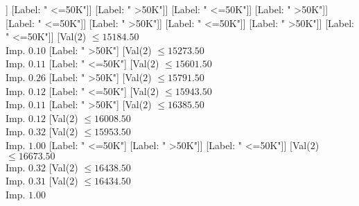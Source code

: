 \documentclass[margin=10pt]{standalone}
\begin{document}
\begin{forest}
																								[Val($2$) $ \leq 14215.50$ \\ Imp. $0.09$
																									[Val($2$) $ \leq 14183.50$ \\ Imp. $0.20$
																										[Val($2$) $ \leq 14078.50$ \\ Imp. $0.12$
																											[Val($2$) $ \leq 14009.50$ \\ Imp. $0.32$
																												[Val($2$) $ \leq 13907.50$ \\ Imp. $0.32$
																													[Val($2$) $ \leq 13831.50$ \\ Imp. $1.00$
																														[Label: " <=50K"]
																														[Label: " >50K"]]
																													[Label: " <=50K"]]
																												[Label: " >50K"]]
																											[Label: " <=50K"]]
																										[Label: " >50K"]]
																									[Label: " <=50K"]]
																								[Label: " >50K"]]
																							[Label: " <=50K"]]
																						[Label: " >50K"]]
																					[Label: " <=50K"]]
																				[Val($2$) $ \leq 15184.50$ \\ Imp. $0.10$
																					[Label: " >50K"]
																					[Val($2$) $ \leq 15273.50$ \\ Imp. $0.11$
																						[Label: " <=50K"]
																						[Val($2$) $ \leq 15601.50$ \\ Imp. $0.26$
																							[Label: " >50K"]
																							[Val($2$) $ \leq 15791.50$ \\ Imp. $0.12$
																								[Label: " <=50K"]
																								[Val($2$) $ \leq 15943.50$ \\ Imp. $0.11$
																									[Label: " >50K"]
																									[Val($2$) $ \leq 16385.50$ \\ Imp. $0.12$
																										[Val($2$) $ \leq 16008.50$ \\ Imp. $0.32$
																											[Val($2$) $ \leq 15953.50$ \\ Imp. $1.00$
																												[Label: " <=50K"]
																												[Label: " >50K"]]
																											[Label: " <=50K"]]
																										[Val($2$) $ \leq 16673.50$ \\ Imp. $0.32$
																											[Val($2$) $ \leq 16438.50$ \\ Imp. $0.31$
																												[Val($2$) $ \leq 16434.50$ \\ Imp. $1.00$

\end{forest}
\end{document}

